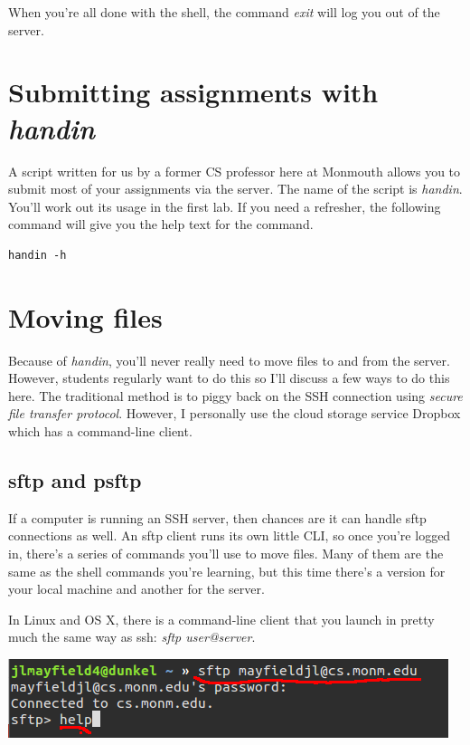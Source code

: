 \documentclass[]{tufte-handout}
\begin{document}
When you're all done with the shell, the command \textit{exit} will log you out of the server.  


\section{Submitting assignments with \textit{handin}}

A script written for us by a former CS professor here at Monmouth allows you to submit most of your assignments via the server. The name of the script is \textit{handin}.  You'll work out its usage in the first lab.  If you need a refresher, the following command will give you the help text for the command.

\begin{verbatim}
handin -h
\end{verbatim}

\section{Moving files}

Because of \textit{handin}, you'll never really need to move files to and from the server.  However, students regularly want to do this so I'll discuss a few ways to do this here.  The traditional method is to piggy back on the SSH connection using \textit{secure file transfer protocol}. However, I personally use the cloud storage service Dropbox which has a command-line client. 

\subsection{sftp and psftp}

If a computer is running an SSH server, then chances are it can handle sftp connections as well.  An sftp client runs its own little CLI, so once you're logged in, there's a series of commands you'll use to move files. Many of them are the same as the shell commands you're learning, but this time there's a version for your local machine and another for the server.


In Linux and OS X, there is a command-line client that you launch in pretty much the same way as ssh: \textit{sftp user@server}. 

\vspace{.1in}
\begin{center}
\includegraphics[scale=.5]{linux-sftplogin.png}
\end{center}
\vspace{.1in}
\end{document}

